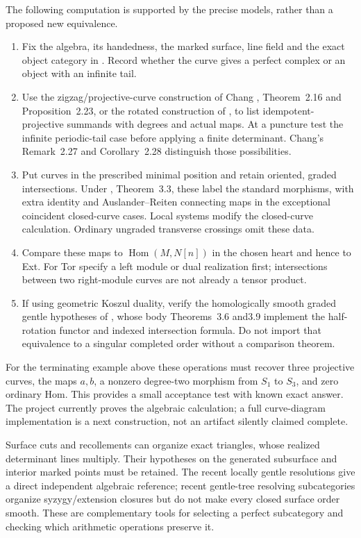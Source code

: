 The following computation is supported by the precise models, rather than a proposed new equivalence.
\begin{enumerate}
\item Fix the algebra, its handedness, the marked surface, line field and the exact object category in \cite{OPS}. Record whether the curve gives a perfect complex or an object with an infinite tail.
\item Use the zigzag/projective-curve construction of Chang \cite{Chang}, Theorem~2.16 and Proposition~2.23, or the rotated construction of \cite{LZZ}, to list idempotent-projective summands with degrees and actual maps. At a puncture test the infinite periodic-tail case before applying a finite determinant. Chang's Remark~2.27 and Corollary~2.28 distinguish those possibilities.
\item Put curves in the prescribed minimal position and retain oriented, graded intersections. Under \cite{OPS}, Theorem~3.3, these label the standard morphisms, with extra identity and Auslander--Reiten connecting maps in the exceptional coincident closed-curve cases. Local systems modify the closed-curve calculation. Ordinary ungraded transverse crossings omit these data.
\item Compare these maps to $\operatorname{Hom}(M,N[n])$ in the chosen heart and hence to Ext. For Tor specify a left module or dual realization first; intersections between two right-module curves are not already a tensor product.
\item If using geometric Koszul duality, verify the homologically smooth graded gentle hypotheses of \cite{Koszul}, whose body Theorems~3.6 and3.9 implement the half-rotation functor and indexed intersection formula. Do not import that equivalence to a singular completed order without a comparison theorem.
\end{enumerate}
For the terminating example above these operations must recover three projective curves, the maps $a,b$, a nonzero degree-two morphism from $S_1$ to $S_3$, and zero ordinary Hom. This provides a small acceptance test with known exact answer. The project currently proves the algebraic calculation; a full curve-diagram implementation is a next construction, not an artifact silently claimed complete.

Surface cuts and recollements \cite{Cuts} can organize exact triangles, whose realized determinant lines multiply. Their hypotheses on the generated subsurface and interior marked points must be retained. The recent locally gentle resolutions \cite{FOZ} give a direct independent algebraic reference; recent gentle-tree resolving subcategories \cite{ResolveTrees} organize syzygy/extension closures but do not make every closed surface order smooth. These are complementary tools for selecting a perfect subcategory and checking which arithmetic operations preserve it.

